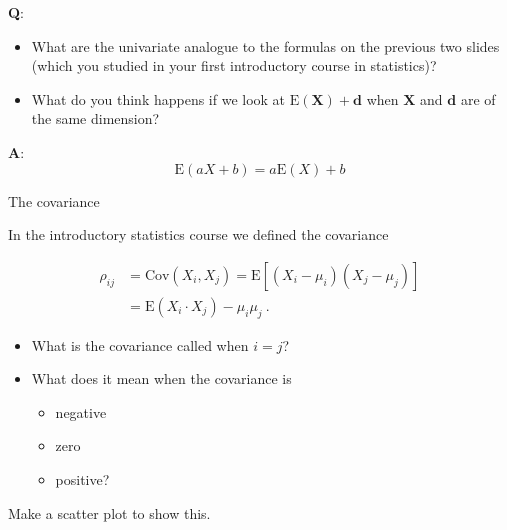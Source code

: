 \documentclass[ignorenonframetext,]{beamer}
\providecommand{\tightlist}{%
  \setlength{\itemsep}{0pt}\setlength{\parskip}{0pt}}
\begin{document}
\begin{frame}

\textbf{Q}:

\begin{itemize}
\item
  What are the univariate analogue to the formulas on the previous two
  slides (which you studied in your first introductory course in
  statistics)?
\item
  What do you think happens if we look at
  \(\text{E}(\boldsymbol{X})+\boldsymbol{d}\) when \(\boldsymbol{X}\)
  and \(\boldsymbol{d}\) are of the same dimension?
\end{itemize}

\textbf{A}: \[\text{E}(aX+b)=a \text{E}(X)+b\]

\end{frame}

\begin{frame}

\begin{block}{The covariance}

\vspace{2mm}

In the introductory statistics course we defined the covariance

\begin{align*}
\rho_{ij} & =\text{Cov}(X_i,X_j)  =\text{E}[(X_i-\mu_i)(X_j-\mu_j)] \\
& =\text{E}(X_i \cdot X_j)-\mu_i\mu_j \ . 
\end{align*}

\begin{itemize}
\tightlist
\item
  What is the covariance called when \(i=j\)?
\item
  What does it mean when the covariance is

  \begin{itemize}
  \tightlist
  \item
    negative
  \item
    zero
  \item
    positive?
  \end{itemize}
\end{itemize}

Make a scatter plot to show this.

\end{block}

\end{frame}
\end{document}
